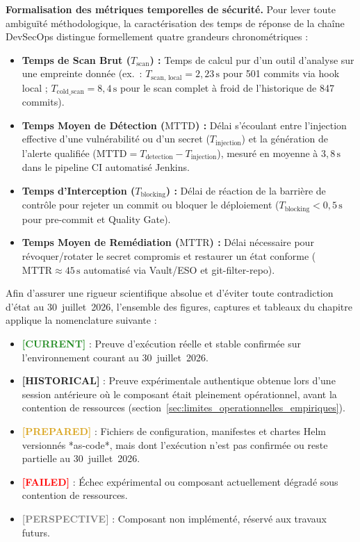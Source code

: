 \textbf{Formalisation des métriques temporelles de sécurité.} Pour lever toute ambiguïté méthodologique, la caractérisation des temps de réponse de la chaîne DevSecOps distingue formellement quatre grandeurs chronométriques :
\begin{itemize}
    \item \textbf{Temps de Scan Brut ($T_{\text{scan}}$) :} Temps de calcul pur d'un outil d'analyse sur une empreinte donnée (ex.~: $T_{\text{scan, local}} = 2{,}23\,\text{s}$ pour 501 commits via hook local ; $T_{\text{cold\_scan}} = 8{,}4\,\text{s}$ pour le scan complet à froid de l'historique de 847 commits).
    \item \textbf{Temps Moyen de Détection ($\text{MTTD}$) :} Délai s'écoulant entre l'injection effective d'une vulnérabilité ou d'un secret ($T_{\text{injection}}$) et la génération de l'alerte qualifiée ($\text{MTTD} = T_{\text{detection}} - T_{\text{injection}}$), mesuré en moyenne à $3{,}8\,\text{s}$ dans le pipeline CI automatisé Jenkins.
    \item \textbf{Temps d'Interception ($T_{\text{blocking}}$) :} Délai de réaction de la barrière de contrôle pour rejeter un commit ou bloquer le déploiement ($T_{\text{blocking}} < 0{,}5\,\text{s}$ pour pre-commit et Quality Gate).
    \item \textbf{Temps Moyen de Remédiation ($\text{MTTR}$) :} Délai nécessaire pour révoquer/rotater le secret compromis et restaurer un état conforme ($\text{MTTR} \approx 45\,\text{s}$ automatisé via Vault/ESO et git-filter-repo).
\end{itemize}

\begin{tcolorbox}[colback=LightGray!20, colframe=clrBlue, arc=3pt, title={\small\bfseries Convention Visuelle de Classification des Preuves et États Expérimentaux}]
Afin d'assurer une rigueur scientifique absolue et d'éviter toute contradiction d'état au 30~juillet~2026, l'ensemble des figures, captures et tableaux du chapitre applique la nomenclature suivante :
\begin{itemize}[leftmargin=*]
    \item \textcolor{ForestGreen}{\textbf{[CURRENT]}} : Preuve d'exécution réelle et stable confirmée sur l'environnement courant au 30~juillet~2026.
    \item \textcolor{NavyBlue}{\textbf{[HISTORICAL]}} : Preuve expérimentale authentique obtenue lors d'une session antérieure où le composant était pleinement opérationnel, avant la contention de ressources (section~\ref{sec:limites_operationnelles_empiriques}).
    \item \textcolor{Goldenrod}{\textbf{[PREPARED]}} : Fichiers de configuration, manifestes et chartes Helm versionnés *as-code*, mais dont l'exécution n'est pas confirmée ou reste partielle au 30~juillet~2026.
    \item \textcolor{red}{\textbf{[FAILED]}} : Échec expérimental ou composant actuellement dégradé sous contention de ressources.
    \item \textcolor{gray}{\textbf{[PERSPECTIVE]}} : Composant non implémenté, réservé aux travaux futurs.
\end{itemize}
\end{tcolorbox}


